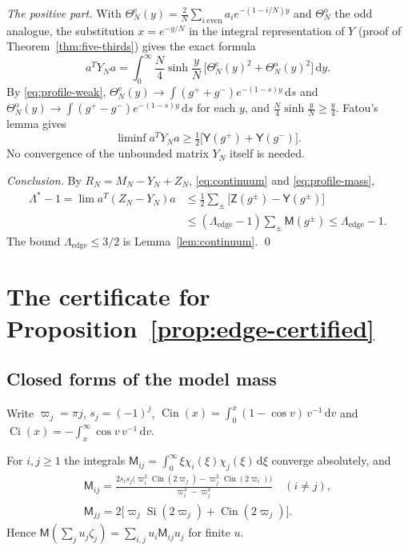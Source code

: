 \documentclass{siamart251216}
\newcommand{\dd}{\,\mathrm d}
\begin{document}
\emph{The positive part.} With
$\Theta^{\mathrm e}_N(y)=\frac2N\sum_{i\ \mathrm{even}}a_ie^{-(1-i/N)y}$ and
$\Theta^{\mathrm o}_N$ the odd analogue, the substitution $x=e^{-y/N}$ in the
integral representation of $Y$ (proof of Theorem~\ref{thm:five-thirds}) gives
the exact formula
\[
 a^TY_Na=\int_0^\infty\frac N4\sinh\frac yN\,
 \bigl[\Theta^{\mathrm e}_N(y)^2+\Theta^{\mathrm o}_N(y)^2\bigr]\dd y .
\]
By \eqref{eq:profile-weak}, $\Theta^{\mathrm e}_N(y)\to\int(g^++g^-)e^{-(1-s)y}\dd s$
and $\Theta^{\mathrm o}_N(y)\to\int(g^+-g^-)e^{-(1-s)y}\dd s$ for each $y$, and
$\frac N4\sinh\frac yN\ge\frac y4$. Fatou's lemma gives
\[
 \liminf a^TY_Na\ge\tfrac12\bigl[\mathsf Y(g^+)+\mathsf Y(g^-)\bigr].
\]
No convergence of the unbounded matrix $Y_N$ itself is needed.

\emph{Conclusion.} By $R_N=M_N-Y_N+Z_N$, \eqref{eq:continuum} and
\eqref{eq:profile-mass},
\begin{align*}
 \Lambda^*-1=\lim a^T(Z_N-Y_N)a
 &\le\tfrac12\sum_\pm\bigl[\mathsf Z(g^\pm)-\mathsf Y(g^\pm)\bigr]\\
 &\le(\Lambda_{\mathrm{edge}}-1)\sum_\pm\mathsf M(g^\pm)
 \le\Lambda_{\mathrm{edge}}-1 .
\end{align*}
The bound $\Lambda_{\mathrm{edge}}\le3/2$ is Lemma~\ref{lem:continuum}. \qed

\section{The certificate for Proposition~\ref{prop:edge-certified}}\label{app:certificate}

\subsection{Closed forms of the model mass}

Write $\varpi_j=\pi j$, $s_j=(-1)^j$,
$\operatorname{Cin}(x)=\int_0^x(1-\cos v)\,v^{-1}\dd v$ and
$\operatorname{Ci}(x)=-\int_x^\infty\cos v\,v^{-1}\dd v$.

\begin{lemma}\label{lem:closed-form}%
For $i,j\ge1$ the integrals $\mathsf M_{ij}=\int_0^\infty\xi\chi_i(\xi)\chi_j(\xi)\dd\xi$
converge absolutely, and
\begin{gather*}
 \mathsf M_{ij}=\frac{2s_is_j\bigl(\varpi_i^2\operatorname{Cin}(2\varpi_j)-\varpi_j^2\operatorname{Cin}(2\varpi_i)\bigr)}{\varpi_i^2-\varpi_j^2}\quad(i\ne j),\\
 \mathsf M_{jj}=2\bigl[\varpi_j\operatorname{Si}(2\varpi_j)+\operatorname{Cin}(2\varpi_j)\bigr].
\end{gather*}
Hence $\mathsf M(\sum_ju_j\zeta_j)=\sum_{i,j}u_i\mathsf M_{ij}u_j$ for finite $u$.
\end{lemma}
\end{document}

